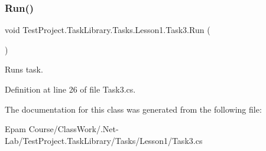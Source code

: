 \subsubsection{\texorpdfstring{Run()}{Run()}}
{\footnotesize\ttfamily void Test\+Project.\+Task\+Library.\+Tasks.\+Lesson1.\+Task3.\+Run (\begin{DoxyParamCaption}{ }\end{DoxyParamCaption})}



Runs task. 



Definition at line 26 of file Task3.\+cs.



The documentation for this class was generated from the following file\+:\begin{DoxyCompactItemize}
\item 
Epam Course/\+Class\+Work/.\+Net-\/\+Lab/\+Test\+Project.\+Task\+Library/\+Tasks/\+Lesson1/Task3.\+cs\end{DoxyCompactItemize}
